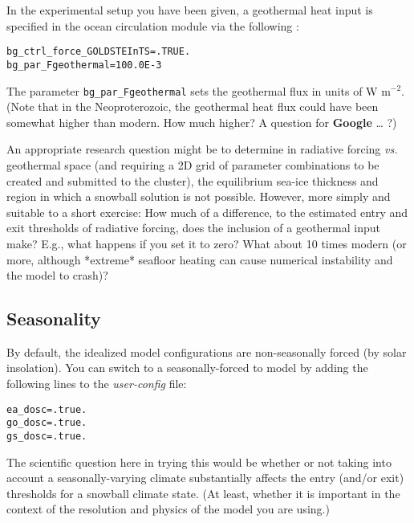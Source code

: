 \documentclass[11pt,fleqn]{book} %
\begin{document}
In the experimental setup you have been given, a geothermal heat input is specified in the ocean circulation module via the following :

\vspace{-2mm}
\begin{verbatim}
bg_ctrl_force_GOLDSTEInTS=.TRUE.
bg_par_Fgeothermal=100.0E-3
\end{verbatim}
\vspace{-2mm}

The parameter \texttt{bg\_par\_Fgeothermal} sets the geothermal flux in units of W m$^{-2}$. (Note that in the Neoproterozoic, the geothermal heat flux could have been somewhat higher than modern. How much higher? A question for \textbf{Google} … ?)

An appropriate research question might be to determine in radiative forcing \textit{vs.} geothermal space (and requiring a 2D grid of parameter combinations to be created and submitted to the cluster), the equilibrium sea-ice thickness and region in which a snowball solution is not possible. However, more simply and suitable to a short exercise: How much of a difference, to the estimated entry and exit thresholds of radiative forcing, does the inclusion of a geothermal input make? E.g., what happens if you set it to zero? What about 10 times modern (or more, although *extreme* seafloor heating can cause numerical instability and the model to crash)?


\subsection{Seasonality}

By default, the idealized model configurations are non-seasonally forced (by solar insolation). You can switch to a seasonally-forced to model by adding the following lines to the \textit{user-config} file:

\vspace{-3mm}
\begin{verbatim}
ea_dosc=.true.
go_dosc=.true.
gs_dosc=.true.
\end{verbatim}
\vspace{-2mm}

The scientific question here in trying this would be whether or not taking into account a seasonally-varying climate substantially affects the entry (and/or exit) thresholds for a snowball climate state. (At least, whether it is important in the context of the resolution and physics of the model you are using.)
\end{document}
